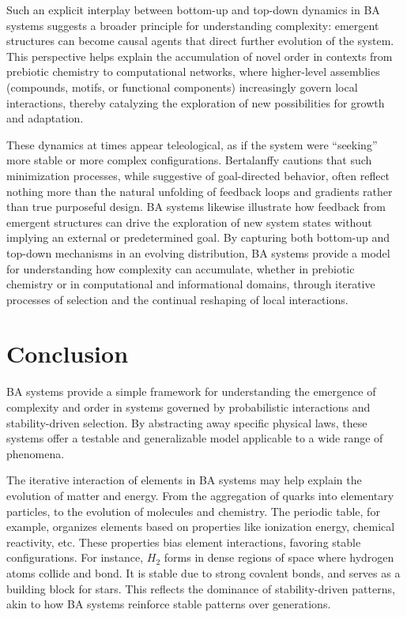 \documentclass[entropy,article,submit,pdftex,moreauthors]{Definitions/mdpi}
\begin{document}
Such an explicit interplay between bottom-up and top-down dynamics in BA systems suggests a broader principle for understanding complexity: emergent structures can become causal agents that direct further evolution of the system. This perspective helps explain the accumulation of novel order in contexts from prebiotic chemistry to computational networks, where higher-level assemblies (compounds, motifs, or functional components) increasingly govern local interactions, thereby catalyzing the exploration of new possibilities for growth and adaptation.

These dynamics at times appear teleological, as if the system were ``seeking'' more stable or more complex configurations. Bertalanffy \cite{bertalanffy1968general} cautions that such minimization processes, while suggestive of goal-directed behavior, often reflect nothing more than the natural unfolding of feedback loops and gradients rather than true purposeful design. BA systems likewise illustrate how feedback from emergent structures can drive the exploration of new system states without implying an external or predetermined goal. By capturing both bottom-up and top-down mechanisms in an evolving distribution, BA systems provide a model for understanding how complexity can accumulate, whether in prebiotic chemistry or in computational and informational domains, through iterative processes of selection and the continual reshaping of local interactions.


\section{Conclusion}

BA systems provide a simple framework for understanding the emergence of complexity and order in systems governed by probabilistic interactions and stability-driven selection. By abstracting away specific physical laws, these systems offer a testable and generalizable model applicable to a wide range of phenomena. 

The iterative interaction of elements in BA systems may help explain the evolution of matter and energy. From the aggregation of quarks into elementary particles, to the evolution of molecules and chemistry. The periodic table, for example, organizes elements based on properties like ionization energy, chemical reactivity, etc. These properties bias element interactions, favoring stable configurations. For instance, \( H_2 \) forms in dense regions of space where hydrogen atoms collide and bond. It is stable due to strong covalent bonds, and serves as a building block for stars. This reflects the dominance of stability-driven patterns, akin to how BA systems reinforce stable patterns over generations. 
\end{document}
